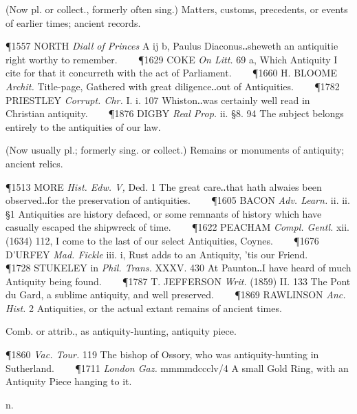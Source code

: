 \begin{description}[wide, labelwidth=!, labelindent=0pt]
\begin{myenumerate}
 (Now pl. or collect., formerly often sing.) Matters, customs, precedents, or events of earlier times; ancient records.

\P 1557 NORTH  \textit{Diall of Princes} A ij b, Paulus Diaconus‥sheweth an antiquitie right worthy to remember.    
\P 1629 COKE  \textit{On Litt.} 69 a, Which Antiquity I cite for that it concurreth with the act of Parliament.    
\P 1660 H. BLOOME  \textit{Archit.} Title-page, Gathered with great diligence‥out of Antiquities.    
\P 1782 PRIESTLEY  \textit{Corrupt. Chr.} I. i. 107 Whiston‥was certainly well read in Christian antiquity.    
\P 1876 DIGBY  \textit{Real Prop.} ii. §8. 94 The subject belongs entirely to the antiquities of our law.

 (Now usually pl.; formerly sing. or collect.) Remains or monuments of antiquity; ancient relics.

\P 1513 MORE  \textit{Hist. Edw. V,} Ded. 1 The great care‥that hath alwaies been observed‥for the preservation of antiquities.    
\P 1605 BACON  \textit{Adv. Learn.} ii. ii. §1 Antiquities are history defaced, or some remnants of history which have casually escaped the shipwreck of time.    
\P 1622 PEACHAM  \textit{Compl. Gentl.} xii. (1634) 112, I come to the last of our select Antiquities, Coynes.    
\P 1676 D'URFEY  \textit{Mad. Fickle} iii. i, Rust adds to an Antiquity, 'tis our Friend.    
\P 1728 STUKELEY in \textit{Phil. Trans.} XXXV. 430 At Paunton‥I have heard of much Antiquity being found.    
\P 1787 T. JEFFERSON  \textit{Writ.} (1859) II. 133 The Pont du Gard, a sublime antiquity, and well preserved.    
\P 1869 RAWLINSON  \textit{Anc. Hist.} 2 Antiquities, or the actual extant remains of ancient times.

 Comb. or attrib., as antiquity-hunting, antiquity piece.

\P 1860 \textit{Vac. Tour.} 119 The bishop of Ossory, who was antiquity-hunting in Sutherland.    
\P 1711 \textit{London  Gaz.} mmmmdccclv/4 A small Gold Ring, with an Antiquity Piece hanging to it.
\end{myenumerate}


 n.

\noindent {}

\vspace{-0.3cm}


\end{description}
